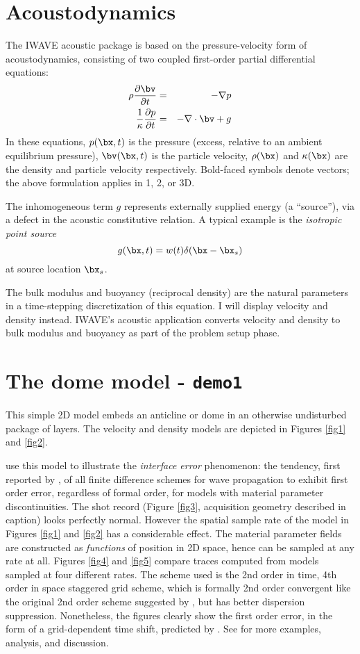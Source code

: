 \section{Acoustodynamics}
The IWAVE acoustic package is based on the pressure-velocity form of acoustodynamics, consisting of two coupled first-order partial differential equations:
\begin{eqnarray}
\label{awe}
\rho \frac{\partial \bv}{\partial t} &=& - \nabla p \\
\frac{1}{\kappa}\frac{\partial p}{\partial t} &=& -\nabla \cdot \bv + g
\end{eqnarray}
In these equations, $p(\bx,t)$ is the pressure (excess, relative to an ambient equilibrium pressure), $\bv(\bx,t)$ is the particle velocity, $\rho(\bx)$ and $\kappa(\bx)$ are the density and particle velocity respectively. Bold-faced symbols denote vectors; the above formulation applies in 1, 2, or 3D. 

The inhomogeneous term $g$ represents externally supplied energy (a
``source''), via a defect in the acoustic constitutive relation. A
typical example is the {\em isotropic point source}
\[
g(\bx,t) = w(t) \delta(\bx-\bx_s)
\]
at source location $\bx_s$.

The bulk modulus and buoyancy (reciprocal density) are the natural parameters in a time-stepping discretization of this equation. I will display velocity and density instead. IWAVE's acoustic application converts velocity and density to bulk modulus and buoyancy as part of the problem setup phase.

\section{The dome model - {\tt demo1}}

This simple 2D model embeds an anticline or dome in an otherwise
undisturbed package of layers. The velocity and density models are
depicted in Figures \ref{fig1} and \ref{fig2}.

\cite[]{SymesVdovina:09} use this model to illustrate the {\em
  interface error} phenomenon: the tendency, first reported by
\cite[]{Brown:84}, of all finite difference schemes for wave
propagation to exhibit first order error, regardless of formal order,
for models with material parameter discontinuities. The shot record
(Figure \ref{fig3}, acquisition geometry described in caption) looks
perfectly normal. However the spatial sample rate of the model in
Figures \ref{fig1} and \ref{fig2} has a considerable effect. The
material parameter fields are constructed as {\em functions} of
position in 2D space, hence can be sampled at any rate at all. Figures
\ref{fig4} and \ref{fig5} compare traces computed from models sampled
at four different rates. The scheme used is the 2nd order in time,
4th order in space staggered grid scheme, which is formally 2nd order
convergent like the original 2nd order scheme suggested by
\cite[]{Vir:84}, but has better dispersion suppression. Nonetheless,
the figures clearly show the first order error, in the form of a
grid-dependent time shift, predicted by \cite[]{Brown:84}. See
\cite{SymesVdovina:09} for more examples, analysis, and discussion.

